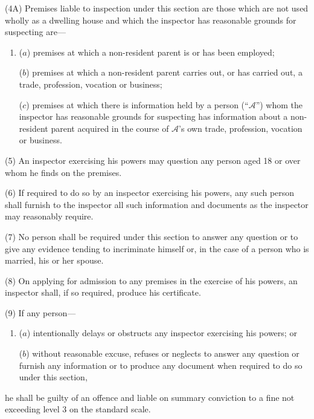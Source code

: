 \documentclass[12pt,a4paper]{article}
\begin{document}
(4A) Premises liable to inspection under this section are those which are not used wholly as a dwelling house and which the inspector has reasonable grounds for suspecting are—
\begin{enumerate}\item[]
($a$) premises at which a non-resident parent is or has been employed;

($b$) premises at which a non-resident parent carries out, or has carried out, a trade, profession, vocation or business;

($c$) premises at which there is information held by a person (“$\mathcal{A}$”) whom the inspector has reasonable grounds for suspecting has information about a non-resident parent acquired in the course of $\mathcal{A}$’s own trade, profession, vocation or business.
\end{enumerate}

(5) An inspector exercising his powers may question any person aged 18 or over whom he finds on the premises.

(6) If required to do so by an inspector exercising his powers, 
%
%
%
any such person  %
shall furnish to the inspector all such information and documents as the inspector may 
reasonably require.

(7) No person shall be required under this section to answer any question or to give any evidence tending to incriminate himself or, in the case of a person who is married, his or her spouse.

(8) On applying for admission to any premises in the exercise of his powers, an inspector shall, if so required, produce his certificate.

(9) If any person—
\begin{enumerate}\item[]
($a$) intentionally delays or obstructs any inspector exercising his powers; or

($b$) without reasonable excuse, refuses or neglects to answer any question or furnish any information or to produce any document when required to do so under this section,
\end{enumerate}
he shall be guilty of an offence and liable on summary conviction to a fine not exceeding level 3 on the standard scale.
\end{document}
